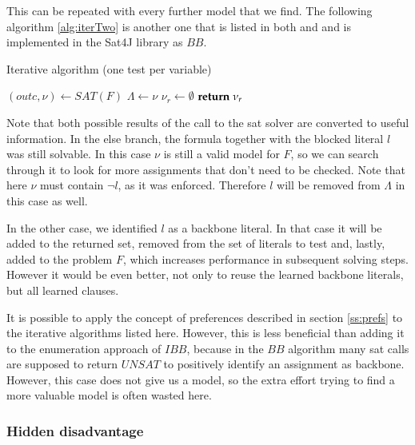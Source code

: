 This can be repeated with every further model that we find. The following algorithm \ref{alg:iterTwo} is another one that is listed in both \cite{mjl10} and \cite{mjl15} and is implemented in the Sat4J library as $BB$.

\begin{algorithm}
\caption{{\sc Iterative algorithm (one test per variable)}}
\DontPrintSemicolon
{}

$(outc,\nu) \gets SAT(F)$\;
$\Lambda \gets \nu$\;
$\nu_r \gets \emptyset$\;
$\Return \; \nu_r$\;
\label{alg:bb}
\end{algorithm}

Note that both possible results of the call to the sat solver are converted to useful information. In the else branch, the formula together with the blocked literal $l$ was still solvable. In this case $\nu$ is still a valid model for $F$, so we can search through it to look for more assignments that don't need to be checked. Note that here $\nu$ must contain $\neg l$, as it was enforced. Therefore $l$ will be removed from $\Lambda$ in this case as well.

In the other case, we identified $l$ as a backbone literal. In that case it will be added to the returned set, removed from the set of literals to test and, lastly, added to the problem $F$, which increases performance in subsequent solving steps. However it would be even better, not only to reuse the learned backbone literals, but all learned clauses.

It is possible to apply the concept of preferences described in section \ref{ss:prefs} to the iterative algorithms listed here. However, this is less beneficial than adding it to the enumeration approach of $IBB$, because in the $BB$ algorithm many sat calls are supposed to return $UNSAT$ to positively identify an assignment as backbone. However, this case does not give us a model, so the extra effort trying to find a more valuable model is often wasted here.

\subsubsection{Hidden disadvantage}


